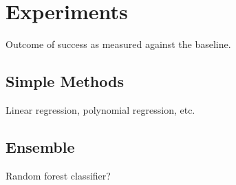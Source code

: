 \section{Experiments}
\label{sec:three}

Outcome of success as measured against the baseline.

\subsection{Simple Methods}

Linear regression, polynomial regression, etc.

\subsection{Ensemble}

Random forest classifier?
